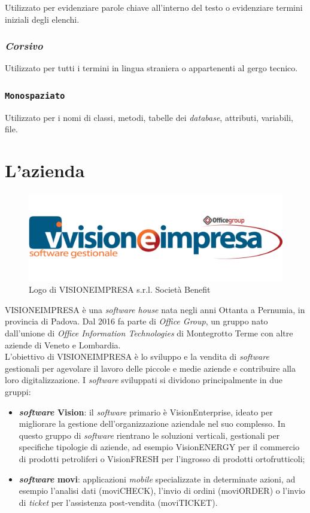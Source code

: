 Utilizzato per evidenziare parole chiave all'interno del testo o evidenziare termini iniziali degli elenchi.

\subsubsection{\textit{Corsivo}}

Utilizzato per tutti i termini in lingua straniera o appartenenti al gergo tecnico.

\subsubsection{\texttt{Monospaziato}}

Utilizzato per i nomi di classi, metodi, tabelle dei \textit{database}, attributi, variabili, file.

\section{L'azienda}

\vspace{-3mm}

\begin{figure}[!h]
    \centering 
    \includegraphics[width=0.6\columnwidth]{images/logo-visioneimpresa.png} 
    \caption{Logo di VISIONEIMPRESA s.r.l. Società Benefit}
\end{figure}

\noindent VISIONEIMPRESA è una \textit{software house} nata negli anni Ottanta a Pernumia, in provincia di Padova. Dal 2016 fa parte di \textit{Office Group}, un gruppo nato dall'unione di \textit{Office Information Technologies} di Montegrotto Terme con altre aziende di Veneto e Lombardia.\\
L'obiettivo di VISIONEIMPRESA è lo sviluppo e la vendita di \textit{software} gestionali per agevolare il lavoro delle piccole e medie aziende e contribuire alla loro digitalizzazione. I \textit{software} sviluppati si dividono principalmente in due gruppi:
\begin{itemize}
    \item \textbf{\textit{software} Vision}: il \textit{software} primario è VisionEnterprise, ideato per migliorare la gestione dell'organizzazione aziendale nel suo complesso. In questo gruppo di \textit{software} rientrano le soluzioni verticali, gestionali per specifiche tipologie di aziende, ad esempio VisionENERGY per il commercio di prodotti petroliferi o VisionFRESH per l'ingrosso di prodotti ortofrutticoli;
    \item \textbf{\textit{software} movi}: applicazioni \textit{mobile} specializzate in determinate azioni, ad esempio l'analisi dati (moviCHECK), l'invio di ordini (moviORDER) o l'invio di \textit{ticket} per l'assistenza post-vendita (moviTICKET).
\end{itemize}

